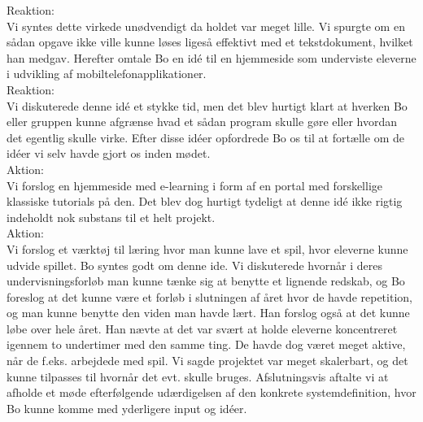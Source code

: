 \documentclass[10pt,a4paper,danish]{article}
\begin{document}
\newline
Reaktion:\\
Vi syntes dette virkede unødvendigt da holdet var meget lille. Vi spurgte om en sådan opgave ikke ville kunne løses ligeså effektivt med et tekstdokument, hvilket han medgav. Herefter omtale Bo en idé til en hjemmeside som underviste eleverne i udvikling af mobiltelefonapplikationer.\\
\newline
Reaktion:\\
Vi diskuterede denne idé et stykke tid, men det blev hurtigt klart at hverken Bo eller gruppen kunne afgrænse hvad et sådan program skulle gøre eller hvordan det egentlig skulle virke. Efter disse idéer opfordrede Bo os til at fortælle om de idéer vi selv havde gjort os inden mødet.\\
\newline
Aktion:\\
Vi forslog en hjemmeside med e-learning i form af en portal med forskellige klassiske tutorials på den. Det blev dog hurtigt tydeligt at denne idé ikke rigtig indeholdt nok substans til et helt projekt.\\
\newline
Aktion:\\
Vi forslog et værktøj til læring hvor man kunne lave et spil, hvor eleverne kunne udvide spillet. Bo syntes godt om denne ide. Vi diskuterede hvornår i deres undervisningsforløb man kunne tænke sig at benytte et lignende redskab, og Bo foreslog at det kunne være et forløb i slutningen af året hvor de havde repetition, og man kunne benytte den viden man havde lært. Han forslog også at det kunne løbe over hele året. 
Han nævte at det var svært at holde eleverne koncentreret igennem to undertimer med den samme ting. De havde dog været meget aktive, når de f.eks. arbejdede med spil. Vi sagde projektet var meget skalerbart, og det kunne tilpasses til hvornår det evt. skulle bruges. Afslutningsvis aftalte vi at afholde et møde efterfølgende udærdigelsen af den konkrete systemdefinition, hvor Bo kunne komme med yderligere input og idéer. 

\end{document}
